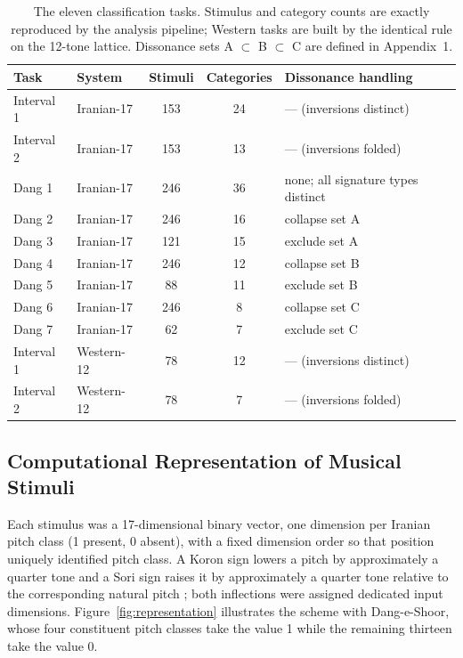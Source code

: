 \documentclass[pdflatex,sn-nature]{sn-jnl}
\begin{document}
\begin{table}[htbp]
\centering
\caption{The eleven classification tasks. Stimulus and category counts are exactly
reproduced by the analysis pipeline; Western tasks are built by the identical rule on the
12-tone lattice. Dissonance sets A $\subset$ B $\subset$ C are defined in Appendix~1.}
\label{tab:tasks}
\small
\begin{tabular}{@{}llccl@{}}
\toprule
Task & System & Stimuli & Categories & Dissonance handling \\
\midrule
Interval 1 & Iranian-17 & 153 & 24 & --- (inversions distinct) \\
Interval 2 & Iranian-17 & 153 & 13 & --- (inversions folded) \\
Dang 1 & Iranian-17 & 246 & 36 & none; all signature types distinct \\
Dang 2 & Iranian-17 & 246 & 16 & collapse set A \\
Dang 3 & Iranian-17 & 121 & 15 & exclude set A \\
Dang 4 & Iranian-17 & 246 & 12 & collapse set B \\
Dang 5 & Iranian-17 & \phantom{0}88 & 11 & exclude set B \\
Dang 6 & Iranian-17 & 246 & \phantom{0}8 & collapse set C \\
Dang 7 & Iranian-17 & \phantom{0}62 & \phantom{0}7 & exclude set C \\
\midrule
Interval 1 & Western-12 & \phantom{0}78 & 12 & --- (inversions distinct) \\
Interval 2 & Western-12 & \phantom{0}78 & \phantom{0}7 & --- (inversions folded) \\
\bottomrule
\end{tabular}
\end{table}

\subsection{Computational Representation of Musical Stimuli}
Each stimulus was a 17-dimensional binary vector, one dimension per Iranian pitch class (1
present, 0 absent), with a fixed dimension order so that position uniquely identified pitch
class. A Koron sign lowers a pitch by approximately a quarter tone and a Sori sign raises it
by approximately a quarter tone relative to the corresponding natural pitch
\cite{talaei1993}; both inflections were assigned dedicated input dimensions.
Figure~\ref{fig:representation} illustrates the scheme with Dang-e-Shoor, whose four
constituent pitch classes take the value 1 while the remaining thirteen take the value 0.
\end{document}
